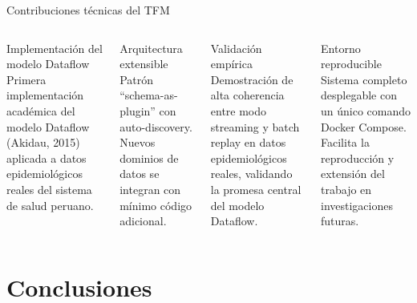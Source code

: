 \documentclass[aspectratio=169, 10pt]{beamer}
\begin{document}
\begin{frame}{Contribuciones t\'ecnicas del TFM}
  \begin{columns}[t]
      \begin{exampleblock}{Implementaci\'on del modelo Dataflow}
        \small
        Primera implementaci\'on acad\'emica del modelo Dataflow
        (Akidau, 2015) aplicada a datos epidemiol\'ogicos reales
        del sistema de salud peruano.
      \end{exampleblock}
      \vspace{4pt}
      \begin{exampleblock}{Arquitectura extensible}
        \small
        Patr\'on ``schema-as-plugin'' con auto-discovery.
        Nuevos dominios de datos se integran con
        m\'inimo c\'odigo adicional.
      \end{exampleblock}
      \begin{exampleblock}{Validaci\'on emp\'irica}
        \small
        Demostraci\'on de alta coherencia entre modo streaming
        y batch replay en datos epidemiol\'ogicos reales,
        validando la promesa central del modelo Dataflow.
      \end{exampleblock}
      \vspace{4pt}
      \begin{exampleblock}{Entorno reproducible}
        \small
        Sistema completo desplegable con un \'unico comando
        Docker Compose. Facilita la reproducci\'on y extensi\'on
        del trabajo en investigaciones futuras.
      \end{exampleblock}
  \end{columns}
\end{frame}

\section{Conclusiones}
\end{document}
